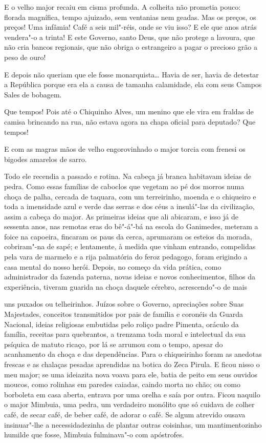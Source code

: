 E o velho major recaiu em cisma profunda. A colheita não prometia pouco:
florada magnífica, tempo ajuizado, sem ventanias nem geadas. Mas os
preços, os preços! Uma infâmia! Café a seis mil"-réis, onde se viu isso?
E ele que anos atrás vendera"-o a trinta! E este Governo, santo Deus, que
não protege a lavoura, que não cria bancos regionais, que não obriga o
estrangeiro a pagar o precioso grão a peso de ouro!

E depois não queriam que ele fosse monarquista\ldots{} Havia de ser, havia de
detestar a República porque era ela a causa de tamanha calamidade, ela
com seus Campos Sales de bobagem.

Que tempos! Pois até o Chiquinho Alves, um menino que ele vira em
fraldas de camisa brincando na rua, não estava agora na chapa oficial
para deputado? Que tempos!

E com as magras mãos de velho engorovinhado o major torcia com frenesi
os bigodes amarelos de sarro.

Todo ele recendia a passado e rotina. Na cabeça já branca habitavam
ideias de pedra. Como essas famílias de caboclos que vegetam ao pé dos
morros numa choça de palha, cercada de taquara, com um terreirinho,
moenda e o chiqueiro e toda a imensidade azul e verde das serras e dos
céus a insulá"-las da civilização, assim a cabeça do major. As primeiras
ideias que ali abicaram, e isso já de sessenta anos, nas remotas eras do
bê"-á"-bá na escola do Ganimedes, meteram a foice na capoeira, fincaram os
paus da cerca, aprumaram os esteios da morada, cobriram"-na de sapé; e
lentamente, à medida que vinham entrando, compelidas pela vara de
marmelo e a rija palmatória do feroz pedagogo, foram erigindo a casa
mental do nosso herói. Depois, no começo da vida prática, como
administrador da fazenda paterna, novas ideias e novos conhecimentos,
filhos da experiência, tiveram guarida na choça daquele cérebro,
acrescendo"-o de mais

uns puxados ou telheirinhos. Juízos sobre o Governo, apreciações sobre
Suas Majestades, conceitos transmitidos por pais de família e coronéis
da Guarda Nacional, ideias religiosas embutidas pelo roliço padre
Pimenta, oráculo da família, receitas para quebrantos, a trenzama toda
moral e intelectual da sua psíquica de matuto ricaço, por lá se arrumou
com o tempo, apesar do acanhamento da choça e das dependências. Para o
chiqueirinho foram as anedotas frescas e as chalaças pesadas aprendidas
na botica do Zeca Pirula. E ficou nisso o meu major; se uma ideiazita
nova voava para ele, batia de peito em seus ouvidos moucos, como
rolinhas em paredes caiadas, caindo morta no chão; ou como borboleta em
casa aberta, entrava por uma orelha e saía por outra. Ficou naquilo o
major Mimbuia, uma pedra, um verdadeiro monólito que só cuidava de
colher café, de secar café, de beber café, de adorar o café. Se algum
atrevido ousava insinuar"-lhe a necessidadezinha de plantar outras
coisinhas, um mantimentozinho humilde que fosse, Mimbuia fulminava"-o com
apóstrofes.


